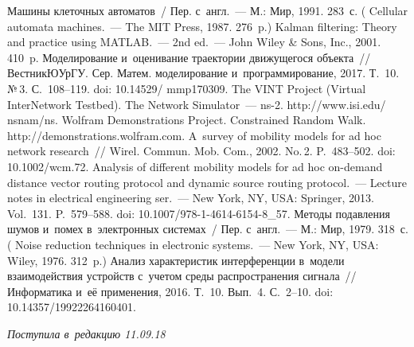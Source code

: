 \begin{multicols}{2}
{{\begin{thebibliography}{99}
 Машины клеточных автоматов~/ Пер. с~англ.~--- М.: 
Мир, 1991. 283~с. ( Cellular automata machines.~--- 
The MIT Press, 1987. 276~p.)
 Kalman filtering: Theory and practice
using MATLAB.~--- 2nd ed.~--- John Wiley \& Sons, Inc., 2001. 410~p.
 Моделирование и~оцени\-ва\-ние траектории движущегося объекта~// 
Вестник\linebreak  ЮУрГУ. Сер. Матем. моделирование и~программирование, 2017. Т.~10. №\,3. 
С.~108--119. doi: 10.14529/ mmp170309.
The VINT Project (Virtual InterNetwork Testbed). The Network Simulator~--- ns-2. {\sf 
http://www.isi.edu/ nsnam/ns}.
Wolfram Demonstrations Project. Constrained Random Walk.
 {\sf http://demonstrations.wolfram.com}.
 A~survey of mobility models for ad hoc network 
research~// Wirel. Commun. Mob. Com., 2002. No.\,2. P.~483--502. doi: 
10.1002/wcm.72.
 Analysis of different mobility models 
for ad hoc on-demand distance vector routing protocol and dynamic source routing 
protocol.~--- Lecture notes in electrical engineering ser.~--- New York, NY, USA: Springer, 
2013. Vol.~131. P.~579--588. doi: 10.1007/978-1-4614-6154-8\_57. 
 Методы подавления шумов и~помех в~электронных системах~/
Пер. с~англ.~--- М.: 
Мир, 1979. 318~с.
( {Noise reduction techniques 
in electronic systems}.~--- 
New York, NY, USA: Wiley, 1976. 312~p.)
Анализ характеристик интерференции в~модели взаимодействия устройств с~учетом 
среды распространения сигнала~// Информатика и~её применения, 2016. Т.~10. 
Вып.~4. С.~2--10. doi: 10.14357/19922264160401.

 \end{thebibliography}

 }
 }

\end{multicols}

\vspace*{-3pt}

\hfill{\small\textit{Поступила в~редакцию 11.09.18}}

\vspace*{8pt}


